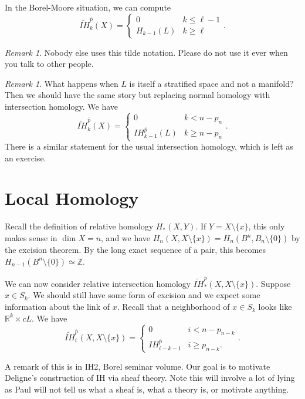 \documentclass[leqno, openany]{memoir}
\theoremstyle{definition}
\theoremstyle{remark}
\newtheorem{rmk}[thm]{Remark}
\theoremstyle{plain}
\theoremstyle{definition}
\theoremstyle{remark}
\newcommand{\R}{\mathbb{R}}
\newcommand{\Z}{\mathbb{Z}}
\begin{document}
In the Borel-Moore situation, we can compute
\[ \widetilde{IH}_k^{\overline{p}}(X) = \begin{cases}
    0 & k \leq \ell - 1 \\
    H_{k-1}(L) & k \geq \ell
\end{cases}. \]
\begin{rmk}
    Nobody else uses this tilde notation. Please do not use it ever when you talk to other people.
\end{rmk}

\begin{rmk}
    What happens when $L$ is itself a stratified space and not a manifold? Then we should have the same story but replacing normal homology with intersection homology. We have
    \[ \widetilde{IH}_k^{\overline{p}}(X) = \begin{cases}
        0 & k < n - p_n \\
        IH_{k-1}^{\overline{p}}(L) & k \geq n - p_n
    \end{cases}. \]
    There is a similar statement for the usual intersection homology, which is left as an exercise.
\end{rmk}

\section{Local Homology}%
\label{sec:local_homology}

Recall the definition of relative homology $H_*(X,Y)$. If $Y = X \setminus \{ x \}$, this only makes sense in $\dim X = n$, and we have $H_n(X, X \setminus \{x\}) = H_n(B^n, B_n \setminus \{0\})$ by the excision theorem. By the long exact sequence of a pair, this becomes $H_{n-1}(B^n \setminus \{0\}) \simeq \Z$. 

We can now consider relative intersection homology $\widetilde{IH}_*^{\overline{p}}(X, X \setminus \{ x \})$. Suppose $x \in S_k$. We should still have some form of excision and we expect some information about the link of $x$. Recall that a neighborhood of $x \in S_k$ looks like $\R^k \times cL$. We have
\[ \widetilde{IH}_i^{\overline{p}}(X, X \setminus \{x \}) = \begin{cases}
    0 & i < n - p_{n-k} \\
    IH_{i-k-1}^{\overline{p}} & i \geq p_{n-k}.
\end{cases}. \]

A remark of this is in IH2, Borel seminar volume. Our goal is to motivate Deligne's construction of IH via sheaf theory. Note this will involve a lot of lying as Paul will not tell us what a sheaf is, what a theory is, or motivate anything.
\end{document}
